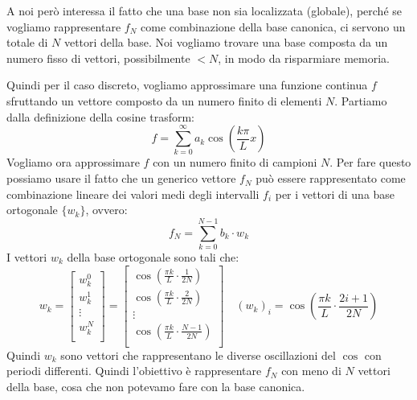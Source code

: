 A noi però interessa il fatto che una base non sia localizzata (globale), perché se vogliamo
rappresentare $f_N$ come combinazione della base canonica, ci servono un totale di
$N$ vettori della base. Noi vogliamo trovare una base composta da un numero
fisso di vettori, possibilmente $< N$, in modo da risparmiare memoria.

Quindi per il caso discreto, vogliamo approssimare una funzione continua $f$
sfruttando un vettore composto da un numero finito di elementi $N$. Partiamo dalla
definizione della cosine trasform:
\begin{equation*}
    f= \sum_{k = 0}^{\infty} a_k\cos \left(\frac{k\pi}{L}x\right)
\end{equation*}
Vogliamo ora approssimare $f$ con un numero finito di campioni $N$. Per fare
questo possiamo usare il fatto che un generico vettore $f_N$ può essere rappresentato
come combinazione lineare dei valori medi degli intervalli $f_i$ per i vettori
di una base ortogonale $\{w_k\}$, ovvero:
\begin{equation}
    f_N = \sum_{k=0}^{N-1} b_k \cdot w_k
\end{equation}
I vettori $w_k$ della base ortogonale sono tali che:
\begin{equation*}
    w_k =\left[\begin{array}{c}
            w_k^0  \\
            w_k^1  \\
            \vdots \\
            w_k^N  \\
        \end{array}\right] = \left[\begin{array}{c}
            \cos \left(\frac{\pi k}{L}\cdot \frac{1}{2N}\right)   \\
            \cos \left(\frac{\pi k}{L}\cdot \frac{2}{2N}\right)   \\
            \vdots                                                \\
            \cos \left(\frac{\pi k}{L}\cdot \frac{N-1}{2N}\right) \\
        \end{array}\right]
    \quad (w_k)_i = \cos \left(\frac{\pi k}{L}\cdot \frac{2i+1}{2N}\right)
\end{equation*}
Quindi $w_k$ sono vettori che rappresentano le diverse oscillazioni del $\cos$
con periodi differenti. Quindi l'obiettivo è rappresentare $f_N$ con meno di $N$
vettori della base, cosa che non potevamo fare con la base canonica.

